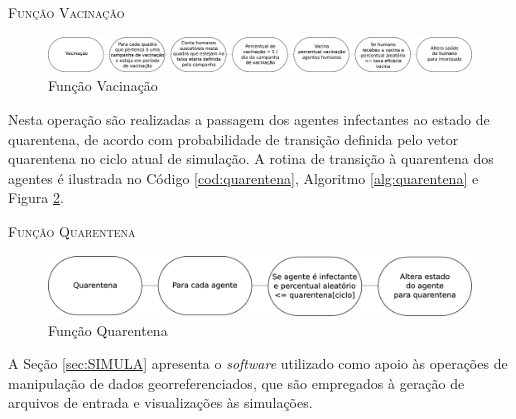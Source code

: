 \begin{algorithm}[H]
 \SetAlgoLined  
 
 \caption{\textsc{Função Vacinação}} 
 \label{alg:vacinacao}
\end{algorithm}

\begin{figure}[H]
  \centering
  \includegraphics[width=1\textwidth]{Figuras/EstruturasDadosEstrategias/Operadores/Vacinacao.eps}
  \caption{Função Vacinação}
  \label{fig:vacinacao}
\end{figure} 


Nesta operação são realizadas a passagem dos agentes infectantes ao estado de quarentena, de acordo com probabilidade de transição definida pelo vetor quarentena no ciclo atual de simulação. A rotina de transição à quarentena dos agentes é ilustrada no Código \ref{cod:quarentena}, Algoritmo \ref{alg:quarentena} e Figura \ref{fig:quarentena}. 



\begin{algorithm}[H]
 \SetAlgoLined  
 
 \caption{\textsc{Função Quarentena}} 
 \label{alg:quarentena}
\end{algorithm}

\begin{figure}[H]
  \centering
  \includegraphics[width=1\textwidth]{Figuras/EstruturasDadosEstrategias/Operadores/Quarentena.eps}
  \caption{Função Quarentena}
  \label{fig:quarentena}
\end{figure} 

A Seção \ref{sec:SIMULA} apresenta o \textit{software} utilizado como apoio às operações de manipulação de dados georreferenciados, que são empregados à geração de arquivos de entrada e visualizações às simulações.

\newpage